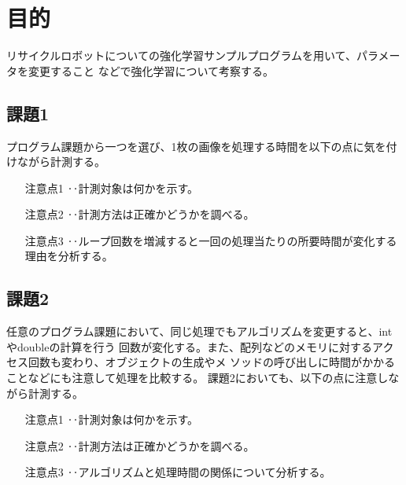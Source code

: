 \section{目的}
リサイクルロボットについての強化学習サンプルプログラムを用いて、パラメータを変更すること
などで強化学習について考察する。
\subsection{課題1}
プログラム課題から一つを選び、1枚の画像を処理する時間を以下の点に気を付けながら計測する。
\begin{itemize}
  \setlength{\leftskip}{2.0cm}
  \item[注意点1] ‥計測対象は何かを示す。
  \item[注意点2] ‥計測方法は正確かどうかを調べる。
  \item[注意点3] ‥ループ回数を増減すると一回の処理当たりの所要時間が変化する理由を分析する。
\end{itemize}

\subsection{課題2}
任意のプログラム課題において、同じ処理でもアルゴリズムを変更すると、intやdoubleの計算を行う
回数が変化する。また、配列などのメモリに対するアクセス回数も変わり、オブジェクトの生成やメ
ソッドの呼び出しに時間がかかることなどにも注意して処理を比較する。
課題2においても、以下の点に注意しながら計測する。
\begin{itemize}
  \setlength{\leftskip}{2.0cm}
  \item[注意点1] ‥計測対象は何かを示す。
  \item[注意点2] ‥計測方法は正確かどうかを調べる。
  \item[注意点3] ‥アルゴリズムと処理時間の関係について分析する。
\end{itemize}